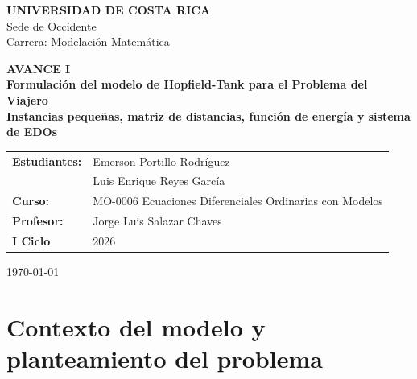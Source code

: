 \documentclass[12pt,a4paper]{article}
\begin{document}
\hypersetup{pageanchor=false}
\begin{titlepage}
    \centering
    \vspace*{1cm}
    
    {\huge \textcolor{azulUCR}{\textbf{UNIVERSIDAD DE COSTA RICA}}}\\[0.5cm]
    {\Large Sede de Occidente}\\[0.3cm]
    {\Large Carrera: Modelación Matemática}\\[2cm]
    
    \begin{tcolorbox}[
        colback=azulClaro!20,
        colframe=azulUCR,
        boxrule=2pt,
        arc=4mm,
        width=0.9\textwidth
    ]
        \centering
        \vspace{0.5cm}
        {\Large \textbf{AVANCE I}}\\[0.3cm]
        {\LARGE \textbf{Formulación del modelo de Hopfield-Tank para el Problema del Viajero}}\\[0.9cm]
        {\Large \textbf{Instancias pequeñas, matriz de distancias, función de energía y sistema de EDOs}}
        \vspace{0.5cm}
    \end{tcolorbox}
    
    \vspace{2cm}
    
    \begin{tabular}{ll}
        \textbf{Estudiantes:} & Emerson Portillo Rodríguez\\
                            & Luis Enrique Reyes García\\[0.5cm]
        \textbf{Curso:} & MO-0006 Ecuaciones Diferenciales Ordinarias con Modelos\\
        \textbf{Profesor:} & Jorge Luis Salazar Chaves\\[0.5cm]
        \textbf{I Ciclo} & 2026
    \end{tabular}
    
    \vfill
    {\large \today}
\end{titlepage}
\hypersetup{pageanchor=true}

\section{Contexto del modelo y planteamiento del problema}
\end{document}
